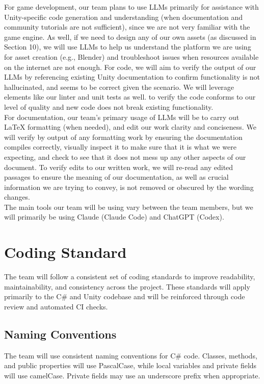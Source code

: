 \documentclass{article}
\begin{document}
For game development, our team plans to use LLMs primarily for assistance with Unity-specific code generation and
understanding (when documentation and community tutorials are not sufficient), since we are not very familiar with the
game engine. As well, if we need to design any of our own assets (as discussed in Section 10), we will use LLMs to help
us understand the platform we are using for asset creation (e.g., Blender) and troubleshoot issues when resources available
on the internet are not enough. For code, we will aim to verify the output of our LLMs by referencing existing Unity
documentation to confirm functionality is not hallucinated, and seems to be correct given the scenario. We will leverage
elements like our linter and unit tests as well. to verify the code conforms to our level of quality and new code does not
break existing functionality.\\

For documentation, our team's primary usage of LLMs will be to carry out \LaTeX{} formatting (when needed), and edit our work
clarity and conciseness. We will verify by output of any formatting work by ensuring the documentation compiles correctly,
visually inspect it to make sure that it is what we were expecting, and check to see that it does not mess up any other
aspects of our document. To verify edits to our written work, we will re-read any edited passages to ensure the meaning of
our documentation, as well as crucial information we are trying to convey, is not removed or obscured by the wording changes.\\

The main tools our team will be using vary between the team members, but we will primarily be using Claude (Claude Code) and ChatGPT (Codex).
\section{Coding Standard}

The team will follow a consistent set of coding standards to improve
readability, maintainability, and consistency across the project. These
standards will apply primarily to the C\# and Unity codebase and will be
reinforced through code review and automated CI checks.

\subsection{Naming Conventions}

The team will use consistent naming conventions for C\# code. Classes,
methods, and public properties will use PascalCase, while local variables
and private fields will use camelCase. Private fields may use an underscore
prefix when appropriate.
\end{document}
